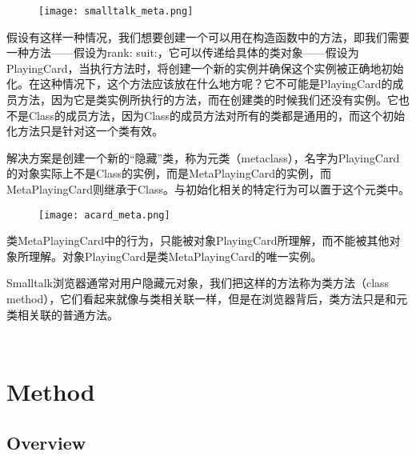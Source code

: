 \begin{figure}[htbp]
\centering
\texttt{[image: smalltalk\_meta.png]}
\label{fig:smalltalk_meta}
\end{figure}

假设有这样一种情况，我们想要创建一个可以用在构造函数中的方法，即我们需要一种方法——假设为rank: suit:，它可以传递给具体的类对象——假设为PlayingCard，当执行方法时，将创建一个新的实例并确保这个实例被正确地初始化。在这种情况下，这个方法应该放在什么地方呢？它不可能是PlayingCard的成员方法，因为它是类实例所执行的方法，而在创建类的时候我们还没有实例。它也不是Class的成员方法，因为Class的成员方法对所有的类都是通用的，而这个初始化方法只是针对这一个类有效。

解决方案是创建一个新的“隐藏”类，称为元类（metaclass），名字为PlayingCard的对象实际上不是Class的实例，而是MetaPlayingCard的实例，而MetaPlayingCard则继承于Class。与初始化相关的特定行为可以置于这个元类中。


\begin{figure}[htbp]
\centering
\texttt{[image: acard\_meta.png]}
\label{fig:acard_meta}
\end{figure}

类MetaPlayingCard中的行为，只能被对象PlayingCard所理解，而不能被其他对象所理解。对象PlayingCard是类MetaPlayingCard的唯一实例。

Smalltalk浏览器通常对用户隐藏元对象，我们把这样的方法称为类方法（class method），它们看起来就像与类相关联一样，但是在浏览器背后，类方法只是和元类相关联的普通方法。


\begin{lstlisting}[language=C++]

\end{lstlisting}





\begin{lstlisting}[language=C++]

\end{lstlisting}




\chapter{Method}



\section{Overview}


